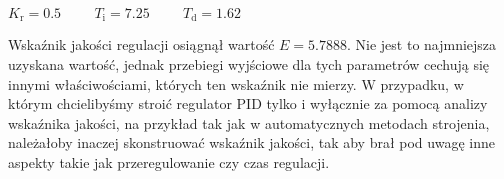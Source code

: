\begin{center}
    $K_{\mathrm{r}} = \num{0,5} \mathrm{\hspace{1cm}}T_{\mathrm{i}} = \num{7,25} \mathrm{\hspace{1cm}} T_{\mathrm{d}} = \num{1,62}$
\end{center}

Wskaźnik jakości regulacji osiągnął wartość $E = \num{5,7888}$. Nie jest to najmniejsza 
uzyskana wartość, jednak przebiegi wyjściowe dla tych parametrów cechują się innymi właściwościami,
których ten wskaźnik nie mierzy. W przypadku, w którym chcielibyśmy stroić regulator PID tylko i wyłącznie
za pomocą analizy wskaźnika jakości, na przykład tak jak w automatycznych metodach strojenia, należałoby
inaczej skonstruować wskaźnik jakości, tak aby brał pod uwagę inne aspekty takie jak przeregulowanie czy czas
regulacji.